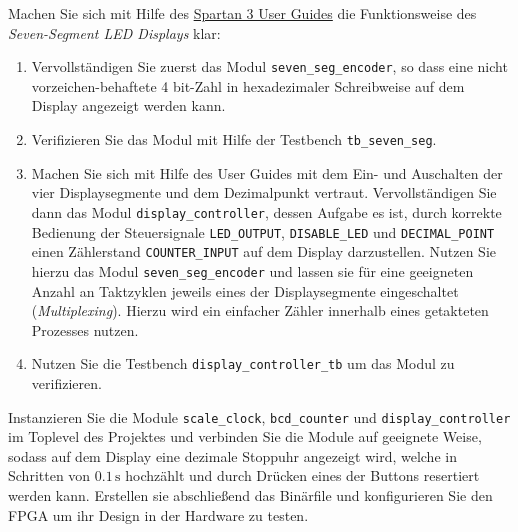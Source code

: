 \documentclass[12pt]{article}
\begin{document}


Machen Sie sich mit Hilfe des \textcolor{blue}{\href{https://www.xilinx.com/support/documentation/boards_and_kits/ug130.pdf}{Spartan 3 User Guides}} die Funktionsweise des \textit{Seven-Segment LED Displays} klar:


\begin{enumerate}[label=\alph*.)]


\item Vervollständigen Sie zuerst das Modul \texttt{seven\_seg\_encoder}, so dass eine nicht vorzeichen-behaftete 4 bit-Zahl in hexadezimaler Schreibweise auf dem Display angezeigt werden kann.


\item Verifizieren Sie das Modul mit Hilfe der Testbench \texttt{tb\_seven\_seg}.


\item Machen Sie sich mit Hilfe des User Guides mit dem Ein- und Auschalten der vier Displaysegmente und dem Dezimalpunkt vertraut.
Vervollständigen Sie dann das Modul \texttt{display\_controller}, dessen Aufgabe es ist, durch korrekte Bedienung der Steuersignale \texttt{LED\_OUTPUT}, \texttt{DISABLE\_LED} und \texttt{DECIMAL\_POINT} einen Zählerstand \texttt{COUNTER\_INPUT} auf dem Display darzustellen.
Nutzen Sie hierzu das Modul \texttt{seven\_seg\_encoder} und lassen sie für eine geeigneten Anzahl an Taktzyklen jeweils
eines der Displaysegmente eingeschaltet (\textit{Multiplexing}).
Hierzu wird ein einfacher Zähler innerhalb eines getakteten Prozesses nutzen.


\item Nutzen Sie die Testbench \texttt{display\_controller\_tb} um das Modul zu verifizieren.


\end{enumerate}







Instanzieren Sie die Module \texttt{scale\_clock}, \texttt{bcd\_counter} und \texttt{display\_controller} im Toplevel des Projektes und verbinden Sie die Module auf geeignete Weise,
sodass auf dem Display eine dezimale Stoppuhr angezeigt wird, welche in Schritten von $0.1\,\mathrm{s}$ hochzählt und durch Drücken eines der Buttons resertiert werden kann.
Erstellen sie abschließend das Binärfile und konfigurieren Sie den FPGA um ihr Design in der Hardware zu testen.
\end{document}
